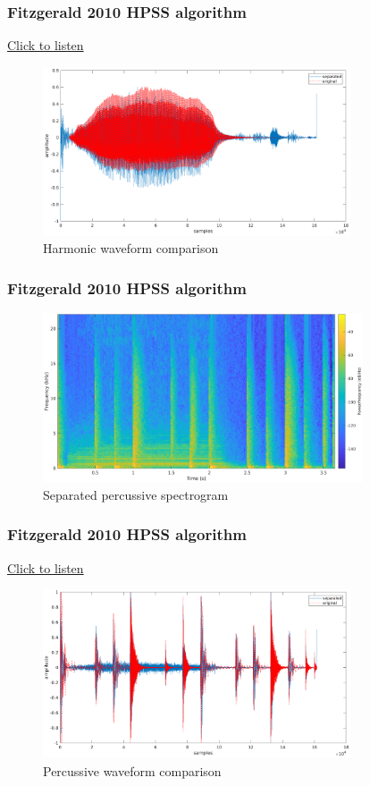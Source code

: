 \documentclass{beamer}
\begin{document}
\begin{frame}
	\frametitle{Fitzgerald 2010 HPSS algorithm}
	\href{run:../audio/harm_fitzgerald_nonrealtime.wav}{Click to listen}\\
	\begin{figure}
	\includegraphics[height=5cm]{../images/harm_fitzgerald_cmp.png}
		\caption{Harmonic waveform comparison}
	\end{figure}
\end{frame}

\begin{frame}
	\frametitle{Fitzgerald 2010 HPSS algorithm}
	\begin{figure}
	\includegraphics[height=5cm]{../images/perc_soft.png}
		\caption{Separated percussive spectrogram}
	\end{figure}
\end{frame}

\begin{frame}
	\frametitle{Fitzgerald 2010 HPSS algorithm}
	\href{run:../audio/perc_fitzgerald_nonrealtime.wav}{Click to listen}\\
	\begin{figure}
	\includegraphics[height=5cm]{../images/perc_fitzgerald_cmp.png}
		\caption{Percussive waveform comparison}
	\end{figure}
\end{frame}
\end{document}
